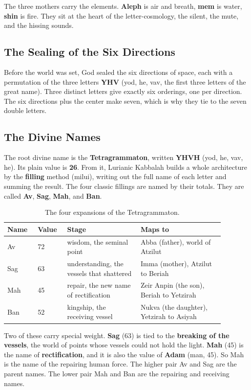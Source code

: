 The three mothers carry the elements. \textbf{Aleph} is air and breath,
\textbf{mem} is water, \textbf{shin} is fire. They sit at the heart of the
letter-cosmology, the silent, the mute, and the hissing sounds.

\subsection{The Sealing of the Six Directions}

Before the world was set, God sealed the six directions of space, each with a
permutation of the three letters \textbf{YHV} (yod, he, vav, the first three
letters of the great name). Three distinct letters give exactly six orderings,
one per direction. The six directions plus the center make seven, which is why
they tie to the seven double letters.

\subsection{The Divine Names}

The root divine name is the \textbf{Tetragrammaton}, written \textbf{YHVH} (yod,
he, vav, he). Its plain value is \textbf{26}. From it, Lurianic Kabbalah builds a
whole architecture by the \textbf{filling} method (milui), writing out the full
name of each letter and summing the result. The four classic fillings are named by
their totals. They are called \textbf{Av}, \textbf{Sag}, \textbf{Mah}, and
\textbf{Ban}.

\begin{longtable}{L{0.12\linewidth} L{0.12\linewidth} L{0.30\linewidth} L{0.34\linewidth}}
\caption{The four expansions of the Tetragrammaton.}\\
\toprule
\textbf{Name} & \textbf{Value} & \textbf{Stage} & \textbf{Maps to} \\
\midrule
Av & 72 & wisdom, the seminal point & Abba (father), world of Atzilut \\
Sag & 63 & understanding, the vessels that shattered & Imma (mother), Atzilut to Beriah \\
Mah & 45 & repair, the new name of rectification & Zeir Anpin (the son), Beriah to Yetzirah \\
Ban & 52 & kingship, the receiving vessel & Nukva (the daughter), Yetzirah to Asiyah \\
\bottomrule
\end{longtable}

Two of these carry special weight. \textbf{Sag} (63) is tied to the
\textbf{breaking of the vessels}, the world of points whose vessels could not hold
the light. \textbf{Mah} (45) is the name of \textbf{rectification}, and it is also
the value of \textbf{Adam} (man, 45). So Mah is the name of the repairing human
force. The higher pair Av and Sag are the parent names. The lower pair Mah and Ban
are the repairing and receiving names.

